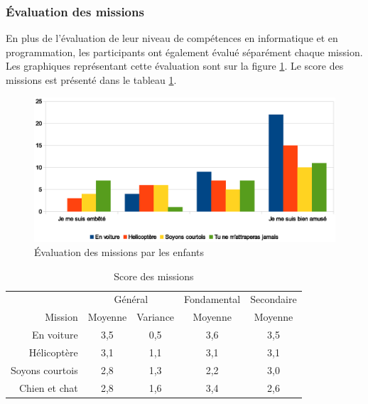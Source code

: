 \subsubsection{Évaluation des missions}
\label{appreciation}
En plus de l'évaluation de leur niveau de compétences en informatique et en programmation, les participants ont également évalué séparément chaque mission. Les graphiques représentant cette évaluation sont sur la figure \ref{fig:evaluation-mission}. Le score des \glspl{mission} est présenté dans le tableau \ref{tab:form-missions}.
\begin{figure}
  \begin{center}
    \includegraphics[width=\textwidth]{content/8-validation/images/aimer}
    \caption{Évaluation des missions par les enfants}
    \label{fig:evaluation-mission}
  \end{center}
\end{figure}

\begin{table}
  \begin{center}
    \begin{tabular}{r|cc|c|c}
                       & \multicolumn{2}{c|}{Général} & Fondamental & Secondaire \\
      Mission          & Moyenne & Variance           & Moyenne     & Moyenne \\ \hline
      En voiture       & 3,5 & 0,5 & 3,6 & 3,5 \\
      Hélicoptère      & 3,1 & 1,1 & 3,1 & 3,1 \\
      Soyons courtois  & 2,8 & 1,3 & 2,2 & 3,0 \\
      Chien et chat    & 2,8 & 1,6 & 3,4 & 2,6 \\
    \end{tabular}
  \end{center}
  \caption{Score des missions}
  \label{tab:form-missions}
\end{table}

